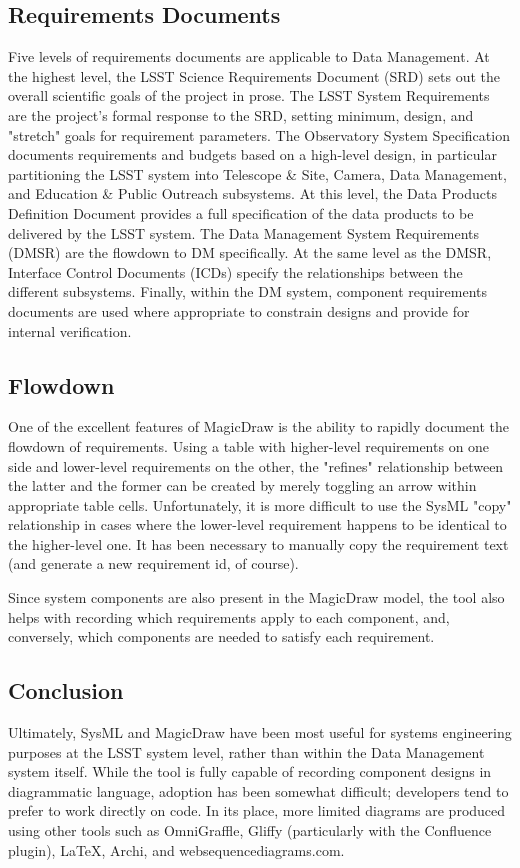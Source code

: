 \subsection{Requirements Documents}

Five levels of requirements documents are applicable to Data Management.
At the highest level, the LSST Science Requirements Document (SRD) sets out the overall scientific goals of the project in prose.
The LSST System Requirements are the project's formal response to the SRD, setting minimum, design, and "stretch" goals for requirement parameters.
The Observatory System Specification documents requirements and budgets based on a high-level design, in particular partitioning the LSST system into Telescope \& Site, Camera, Data Management, and Education \& Public Outreach subsystems.
At this level, the Data Products Definition Document provides a full specification of the data products to be delivered by the LSST system.
The Data Management System Requirements (DMSR) are the flowdown to DM specifically.
At the same level as the DMSR, Interface Control Documents (ICDs) specify the relationships between the different subsystems.
Finally, within the DM system, component requirements documents are used where appropriate to constrain designs and provide for internal verification.

\subsection{Flowdown}

One of the excellent features of MagicDraw is the ability to rapidly document the flowdown of requirements.
Using a table with higher-level requirements on one side and lower-level requirements on the other, the "refines" relationship between the latter and the former can be created by merely toggling an arrow within appropriate table cells.
Unfortunately, it is more difficult to use the SysML "copy" relationship in cases where the lower-level requirement happens to be identical to the higher-level one.
It has been necessary to manually copy the requirement text (and generate a new requirement id, of course).

Since system components are also present in the MagicDraw model, the tool also helps with recording which requirements apply to each component, and, conversely, which components are needed to satisfy each requirement.

\subsection{Conclusion}

Ultimately, SysML and MagicDraw have been most useful for systems engineering purposes at the LSST system level, rather than within the Data Management system itself.
While the tool is fully capable of recording component designs in diagrammatic language, adoption has been somewhat difficult; developers tend to prefer to work directly on code.
In its place, more limited diagrams are produced using other tools such as OmniGraffle, Gliffy (particularly with the Confluence plugin), LaTeX, Archi, and websequencediagrams.com.

